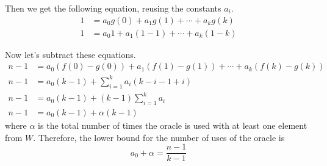 \documentclass{article}
\begin{document}
\begin{description}
        Then we get the following equation, reusing the constants $a_i$.
        \begin{align*}
            1 &= a_0 g(0) + a_1 g(1) + \cdots + a_k g(k) \\
            1 &= a_0 1 + a_1 (1 - 1) + \cdots + a_k (1 - k)
        \end{align*}

        Now let's subtract these equations.
        \begin{align*}
            n - 1 &= a_0 \left(f(0) - g(0)\right) + a_1 \left(f(1) - g(1)\right) + \cdots + a_k \left(f(k) - g(k)\right) \\
            n - 1 &= a_0 \left(k - 1\right) + \sum_{i=1}^k a_i \left(k - i - 1 + i\right) \\
            n - 1 &= a_0 \left(k - 1\right) + (k-1) \sum_{i=1}^k a_i \\
            n - 1 &= a_0 (k - 1) + \alpha (k - 1)
        \end{align*}
        where $\alpha$ is the total number of times the oracle is used with at
        least one element from $W$.
        Therefore, the lower bound for the number of uses of the oracle is
        $$ a_0 + \alpha = \frac{n - 1}{k - 1} $$
\end{description}
\end{document}
